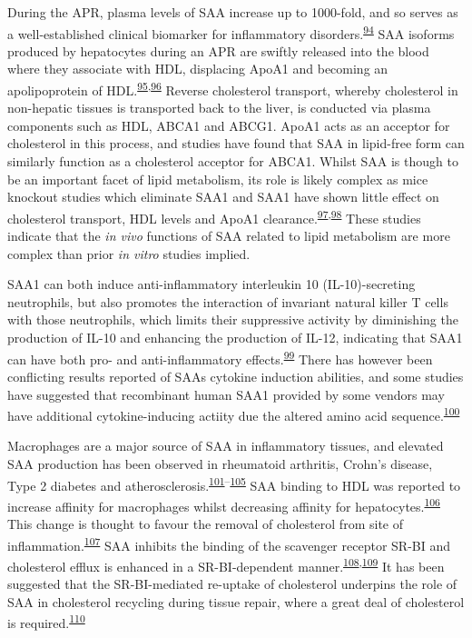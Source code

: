 \documentclass[
]{article}
\begin{document}
During the APR, plasma levels of SAA increase up to 1000-fold, and so serves as a well-established clinical biomarker for inflammatory disorders.\textsuperscript{\protect\hyperlink{ref-epstein_acute-phase_1999}{94}}
SAA isoforms produced by hepatocytes during an APR are swiftly released into the blood where they associate with HDL, displacing ApoA1 and becoming an apolipoprotein of HDL.\textsuperscript{\protect\hyperlink{ref-banka_serum_1995}{95},\protect\hyperlink{ref-benditt_amyloid_1977}{96}}
Reverse cholesterol transport, whereby cholesterol in non-hepatic tissues is transported back to the liver, is conducted via plasma components such as HDL, ABCA1 and ABCG1.
ApoA1 acts as an acceptor for cholesterol in this process, and studies have found that SAA in lipid-free form can similarly function as a cholesterol acceptor for ABCA1.
Whilst SAA is though to be an important facet of lipid metabolism, its role is likely complex as mice knockout studies which eliminate SAA1 and SAA1 have shown little effect on cholesterol transport, HDL levels and ApoA1 clearance.\textsuperscript{\protect\hyperlink{ref-de_beer_impact_2010}{97},\protect\hyperlink{ref-de_beer_atp_2011}{98}}
These studies indicate that the \emph{in vivo} functions of SAA related to lipid metabolism are more complex than prior \emph{in vitro} studies implied.

SAA1 can both induce anti-inflammatory interleukin 10 (IL-10)-secreting neutrophils, but also promotes the interaction of invariant natural killer T cells with those neutrophils, which limits their suppressive activity by diminishing the production of IL-10 and enhancing the production of IL-12, indicating that SAA1 can have both pro- and anti-inflammatory effects.\textsuperscript{\protect\hyperlink{ref-santo_invariant_2010}{99}}
There has however been conflicting results reported of SAAs cytokine induction abilities, and some studies have suggested that recombinant human SAA1 provided by some vendors may have additional cytokine-inducing actiity due the altered amino acid sequence.\textsuperscript{\protect\hyperlink{ref-kim_saa_2013}{100}}

Macrophages are a major source of SAA in inflammatory tissues, and elevated SAA production has been observed in rheumatoid arthritis, Crohn's disease, Type 2 diabetes and atherosclerosis.\textsuperscript{\protect\hyperlink{ref-marzi_acute-phase_2013}{101}--\protect\hyperlink{ref-meek_expression_1994}{105}}
SAA binding to HDL was reported to increase affinity for macrophages whilst decreasing affinity for hepatocytes.\textsuperscript{\protect\hyperlink{ref-kisilevsky_serum_1992}{106}}
This change is thought to favour the removal of cholesterol from site of inflammation.\textsuperscript{\protect\hyperlink{ref-kisilevsky_serum_1991}{107}}
SAA inhibits the binding of the scavenger receptor SR-BI and cholesterol efflux is enhanced in a SR-BI-dependent manner.\textsuperscript{\protect\hyperlink{ref-cai_serum_2005}{108},\protect\hyperlink{ref-van_der_westhuyzen_serum_2005}{109}}
It has been suggested that the SR-BI-mediated re-uptake of cholesterol underpins the role of SAA in cholesterol recycling during tissue repair, where a great deal of cholesterol is required.\textsuperscript{\protect\hyperlink{ref-kisilevsky_acute-phase_2012}{110}}
\end{document}
